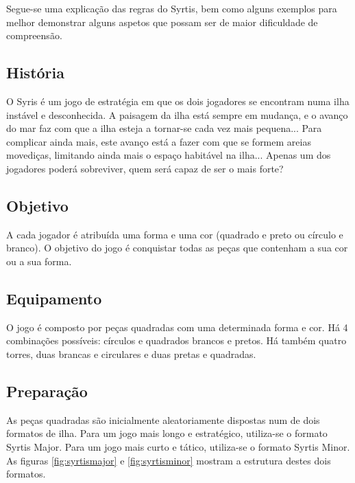 \documentclass[a4paper]{article}
\begin{document}
Segue-se uma explicação das regras do Syrtis, bem como alguns exemplos para melhor demonstrar alguns aspetos que possam ser de maior dificuldade de compreensão.

\subsection{História}

	O Syris é um jogo de estratégia em que os dois jogadores se encontram numa ilha instável e desconhecida. A paisagem da ilha está sempre em mudança, e o avanço do mar faz com que a ilha esteja a tornar-se cada vez mais pequena... Para complicar ainda mais, este avanço está a fazer com que se formem areias movediças, limitando ainda mais o espaço habitável na ilha... Apenas um dos jogadores poderá sobreviver, quem será capaz de ser o mais forte?
	
\subsection{Objetivo}
	
	A cada jogador é atribuída uma forma e uma cor (quadrado e preto ou círculo e branco). O objetivo do jogo é conquistar todas as peças que contenham a sua cor ou a sua forma.
	
\subsection{Equipamento}

	O jogo é composto por peças quadradas com uma determinada forma e cor. Há 4 combinações possíveis: círculos e quadrados brancos e pretos. Há também quatro torres, duas brancas e circulares e duas pretas e quadradas.
	
\subsection{Preparação}

	As peças quadradas são inicialmente aleatoriamente dispostas num de dois formatos de ilha. Para um jogo mais longo e estratégico, utiliza-se o formato Syrtis Major. Para um jogo mais curto e tático, utiliza-se o formato Syrtis Minor. As figuras \ref{fig:syrtismajor} e \ref{fig:syrtisminor} mostram a estrutura destes dois formatos.
	
\end{document}
